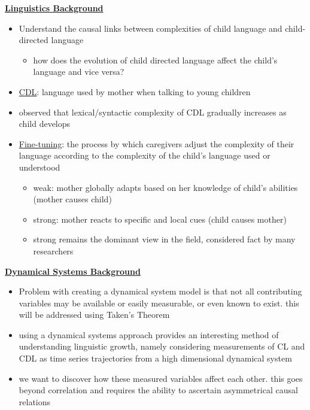 \documentclass[10pt,a4paper]{article}
\author{Jeremy Irvin}
\begin{document}
\noindent\underline{\textbf{Linguistics Background}}
\begin{itemize}
\item Understand the causal links between complexities of child language and child-directed language
\begin{itemize}
\item how does the evolution of child directed language affect the child’s language and vice versa?
\end{itemize}
\item \underline{CDL}: language used by mother when talking to young children
\item observed that lexical/syntactic complexity of CDL gradually increases as child develops
\item \underline{Fine-tuning}: the process by which caregivers adjust the complexity of their language according to the complexity of the child’s language used or understood
\begin{itemize}
	\item weak: mother globally adapts based on her knowledge of child’s abilities (mother causes child)
	\item strong: mother reacts to specific and local cues (child causes mother)
	\item strong remains the dominant view in the field, considered fact by many researchers
	\end{itemize}
\end{itemize}
\noindent\underline{\textbf{Dynamical Systems Background}}
\begin{itemize}
\item Problem with creating a dynamical system model is that not all contributing variables may be available or easily measurable, or even known to exist. this will be addressed using Taken’s Theorem

\item using a dynamical systems approach provides an interesting method of understanding linguistic growth, namely considering measurements of CL and CDL as time series trajectories from a high dimensional dynamical system

\item we want to discover how these measured variables affect each other. this goes beyond correlation and requires the ability to ascertain asymmetrical causal relations

\end{itemize}
\end{document}
